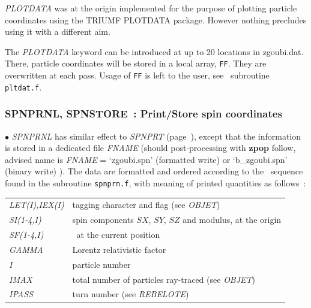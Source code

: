\noindent  \textsl{PLOTDATA} was at the origin implemented for the purpose of plotting particle 
coordinates using the TRIUMF PLOTDATA package. However nothing precludes using it 
with a different aim. 

\medskip

\noindent  The \textsl{PLOTDATA} keyword can be introduced at up to 20 locations in zgoubi.dat.  There, particle coordinates 
will be stored in a local array, \texttt{FF}. They are overwritten at each pass. Usage of \texttt{FF} is left to the user, 
see \FORTRAN\ subroutine \texttt{pltdat.f}. 


\newpage

\subsubsection*{SPNPRNL, SPNSTORE~: Print/Store spin coordinates}
       \label{SPNPRNL} \label{SPNSTORE}

\medskip 

\noindent  $\bullet$   \textsl{SPNPRNL} has similar effect to \textsl{SPNPRT} (page~\pageref{SPNPRT}), 
except that the information is
stored in a  dedicated file \textsl{FNAME} (should post-processing with \textbf{zpop} follow, 
advised name is \textsl{FNAME} = `zgoubi.spn' (formatted write) or `b\_zgoubi.spn' (binary write) ). 
The data are formatted and ordered according to the  \FORTRAN\ sequence found in the subroutine \texttt{spnprn.f}, 
with meaning of printed quantities as follows~: 

\medskip

 \begin{tabular}{>{\sl}l!{~:}l}
	 LET(I),IEX(I)  &  tagging character and flag (see \textsl{OBJET}) \\   
	 SI(1-4,I) & spin components $SX$, $SY$, $SZ$  and modulus, at the origin\\
	 SF(1-4,I)   &  \id\, at the current position\\
	  GAMMA &   Lorentz relativistic factor\\
	  I  &  particle number\\
	 IMAX &  total number of particles ray-traced (see  \textsl{OBJET})\\
	 IPASS &  turn number (see \textsl{REBELOTE})\\
 \end{tabular}

